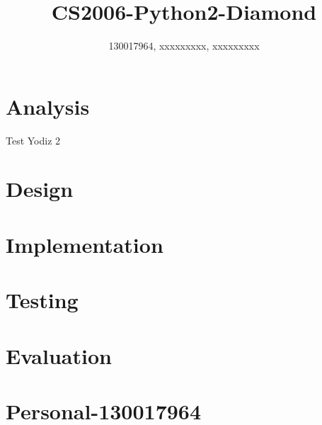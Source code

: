 \documentclass{article}
\title{CS2006-Python2-Diamond}
\author{130017964, xxxxxxxxx, xxxxxxxxx}
\begin{document}
\maketitle

\section{Analysis}
Test Yodiz 2
\section{Design}
\section{Implementation}
\section{Testing}
\section{Evaluation}
\section{Personal-130017964}
\end{document}
